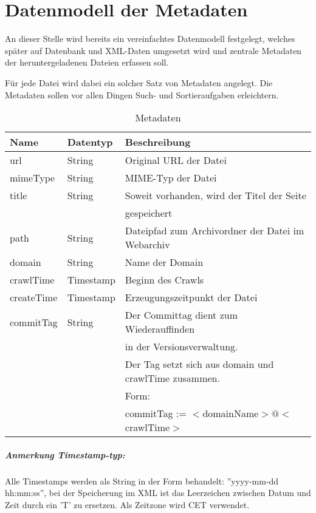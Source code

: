 \chapter{Datenmodell der Metadaten} \label{spec:model}
An dieser Stelle wird bereits ein vereinfachtes Datenmodell festgelegt, 
welches später auf Datenbank und XML-Daten umgesetzt wird und zentrale Metadaten 
der heruntergeladenen Dateien erfassen soll. 

Für jede Datei wird dabei ein solcher Satz von Metadaten angelegt.
Die Metadaten sollen vor allen Dingen Such- und Sortieraufgaben erleichtern. 

\begin{table}[h]
\centering
\begin{tabular}{|l|l|l|}	
	\hline
	Name 		& Datentyp 				& Beschreibung \\
	\hline
	url 		& String 				& Original URL der Datei\\
	\hline
	mimeType	& String 				& MIME-Typ der Datei\\
	\hline
	title 		& String 				& Soweit vorhanden, wird der Titel der Seite \\ 
	 			& 						& gespeichert \\ 
	\hline
	path 		& String 				& Dateipfad zum Archivordner der Datei im Webarchiv \\
	\hline
	domain 		& String 				& Name der Domain \\
	\hline
	crawlTime 	& Timestamp 			& Beginn des Crawls \\
	\hline
	createTime 	& Timestamp 			& Erzeugungszeitpunkt der Datei \\
	\hline
	commitTag 	& String 				& Der Committag dient zum Wiederauffinden \\
	 			& 		 				& in der Versionsverwaltung. \\ 
				& 						& Der Tag setzt sich aus domain und crawlTime zusammen.\\
				&  						& Form: \\
				&  						& commitTag := $<$domainName$>@<$crawlTime$>$ \\
	\hline
\end{tabular}
\caption{Metadaten}
\end{table}

\paragraph{Anmerkung Timestamp-typ:}
Alle Timestamps werden als String in der Form behandelt:
''yyyy-mm-dd hh:mm:ss'', bei der Speicherung im XML ist das Leerzeichen zwischen Datum und Zeit durch ein 'T' zu ersetzen. Als Zeitzone wird CET verwendet.

